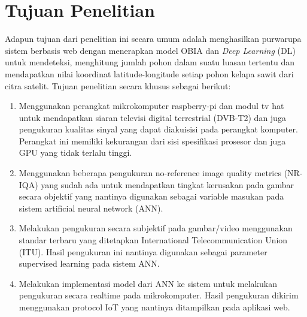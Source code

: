 \section{Tujuan Penelitian}
\label{sec:4-BatasanMasalah}
\hspace{1,2cm}Adapun tujuan dari penelitian ini secara umum adalah menghasilkan purwarupa sistem berbasis web dengan menerapkan model OBIA dan \textit{Deep Learning} (DL) untuk mendeteksi, menghitung jumlah pohon dalam suatu luasan tertentu dan mendapatkan nilai koordinat latitude-longitude setiap pohon kelapa sawit dari citra satelit. Tujuan penelitian secara khusus sebagai berikut: 
\begin{enumerate}
	\item Menggunakan perangkat mikrokomputer raspberry-pi dan modul tv hat untuk mendapatkan siaran televisi digital terrestrial (DVB-T2) dan juga pengukuran kualitas sinyal yang dapat diakuisisi pada perangkat komputer. Perangkat ini memiliki kekurangan dari sisi spesifikasi prosesor dan juga GPU yang tidak terlalu tinggi. 
	\item Menggunakan beberapa pengukuran no-reference image quality metrics (NR-IQA) yang sudah ada untuk mendapatkan tingkat kerusakan pada gambar secara objektif yang nantinya digunakan sebagai variable masukan pada sistem artificial neural network (ANN).
	\item Melakukan pengukuran secara subjektif pada gambar/video menggunakan standar terbaru yang ditetapkan International Telecommunication Union (ITU). Hasil pengukuran ini nantinya digunakan sebagai parameter supervised learning pada sistem ANN.
	\item Melakukan implementasi model dari ANN ke sistem untuk melakukan pengukuran secara realtime pada mikrokomputer. Hasil pengukuran dikirim menggunakan protocol IoT yang nantinya ditampilkan pada aplikasi web.
\end{enumerate}

